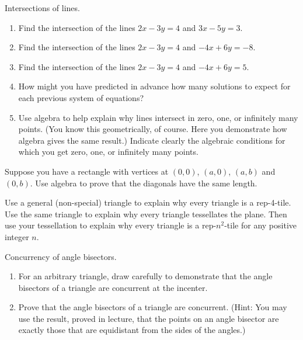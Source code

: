 \begin{prob}
Intersections of lines.  
\begin{enumerate}
\item Find the intersection of the lines $2x-3y=4$ and $3x-5y=3$.  
\item Find the intersection of the lines $2x-3y=4$ and $-4x+6y=-8$.
\item Find the intersection of the lines $2x-3y=4$ and $-4x+6y=5$.
\item How might you have predicted in advance how many solutions to expect for each previous system of equations?
\item Use algebra to help explain why lines intersect in zero, one, or infinitely many points.  (You know this geometrically, of course.  Here you demonstrate how algebra gives the same result.)  Indicate clearly the algebraic conditions
for which you get zero, one, or infinitely many points.  
\end{enumerate}
\end{prob}

\begin{prob}
Suppose you have a rectangle with vertices at $(0,0)$, $(a,0)$,
$(a,b)$ and $(0,b)$. Use algebra to prove that the diagonals have the
same length.
\end{prob}

\begin{prob}
Use a general (non-special) triangle to explain why every triangle is a rep-4-tile.  
Use the same triangle to explain why every triangle tessellates the plane.  Then use your tessellation to explain why every triangle is a rep-$n^2$-tile for any positive integer $n$. 
\end{prob}

\begin{prob} 
Concurrency of angle bisectors. 
\begin{enumerate}
\item For an arbitrary triangle, draw carefully to demonstrate that the angle bisectors of a triangle are concurrent at the incenter.   
\item Prove that the angle bisectors of a triangle are concurrent.  (Hint:  You may use the result, proved in lecture, that the points on an angle bisector are exactly those that are equidistant from the sides of the angles.)  
\end{enumerate}
\end{prob} 


%



